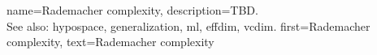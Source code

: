 {name={Rademacher complexity},
	description={TBD.
\\
See also: \gls{hypospace},  \gls{generalization}, \gls{ml}, \gls{effdim}, \gls{vcdim}.}
	first={Rademacher complexity},
	text={Rademacher complexity}  
}



